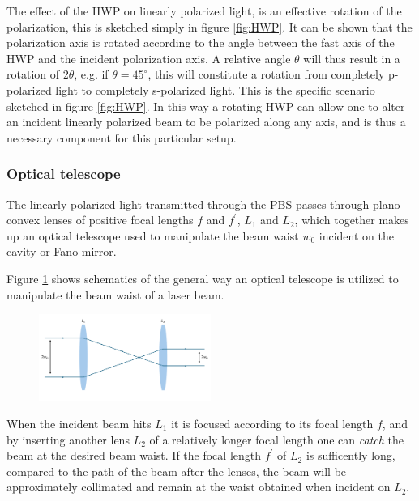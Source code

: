 The effect of the HWP on linearly polarized light, is an effective rotation of the polarization, this is sketched simply in figure \ref{fig:HWP}. It can be shown that the polarization axis is rotated according to the angle between the fast axis of the HWP and the incident polarization axis. A relative angle $\theta$ will thus result in a rotation of $2\theta$, e.g. if $\theta=45^{\circ}$, this will constitute a rotation from completely p-polarized light to completely s-polarized light. This is the specific scenario sketched in figure \ref{fig:HWP}\cite{edmund_optics}. In this way a rotating HWP can allow one to alter an incident linearly polarized beam to be polarized along any axis, and is thus a necessary component for this particular setup.

\subsubsection{Optical telescope}

The linearly polarized light transmitted through the PBS passes through plano-convex lenses of positive focal lengths $f$ and $f^{\prime}$, $L_1$ and $L_2$, which together makes up an optical telescope used to manipulate the beam waist $w_0$ incident on the cavity or Fano mirror. 

Figure \ref{fig:telescope} shows schematics of the general way an optical telescope is utilized to manipulate the beam waist of a laser beam.

\begin{figure}[h!]
    \centering
    \includegraphics[width=0.5\textwidth]{figures/optical_telescope.pdf}
    \caption{}
    \label{fig:telescope}
\end{figure}

When the incident beam hits $L_1$ it is focused according to its focal length $f$, and by inserting another lens $L_2$ of a relatively longer focal length one can \emph{catch} the beam at the desired beam waist. If the focal length $f^{\prime}$ of $L_2$ is sufficently long, compared to the path of the beam after the lenses, the beam will be approximately collimated and remain at the waist obtained when incident on $L_2$.

